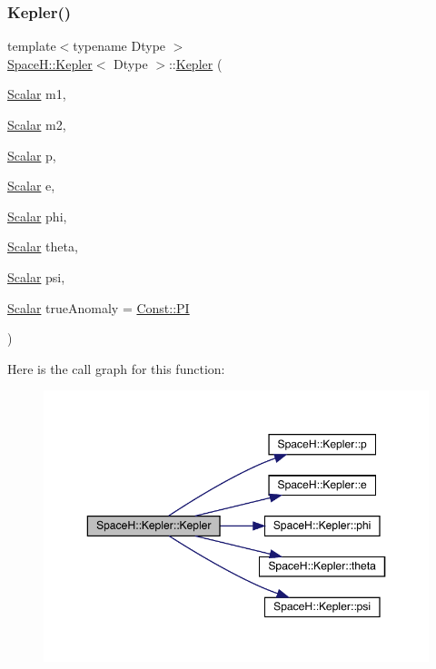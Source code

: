 \subsubsection{\texorpdfstring{Kepler()}{Kepler()}\hspace{0.1cm}{\footnotesize\ttfamily [3/3]}}
{\footnotesize\ttfamily template$<$typename Dtype $>$ \\
\mbox{\hyperlink{struct_space_h_1_1_kepler}{Space\+H\+::\+Kepler}}$<$ Dtype $>$\+::\mbox{\hyperlink{struct_space_h_1_1_kepler}{Kepler}} (\begin{DoxyParamCaption}\item[{\mbox{\hyperlink{struct_space_h_1_1_kepler_a19291f268209f594a96fb4828fa1a54c}{Scalar}}}]{m1,  }\item[{\mbox{\hyperlink{struct_space_h_1_1_kepler_a19291f268209f594a96fb4828fa1a54c}{Scalar}}}]{m2,  }\item[{\mbox{\hyperlink{struct_space_h_1_1_kepler_a19291f268209f594a96fb4828fa1a54c}{Scalar}}}]{p,  }\item[{\mbox{\hyperlink{struct_space_h_1_1_kepler_a19291f268209f594a96fb4828fa1a54c}{Scalar}}}]{e,  }\item[{\mbox{\hyperlink{struct_space_h_1_1_kepler_a19291f268209f594a96fb4828fa1a54c}{Scalar}}}]{phi,  }\item[{\mbox{\hyperlink{struct_space_h_1_1_kepler_a19291f268209f594a96fb4828fa1a54c}{Scalar}}}]{theta,  }\item[{\mbox{\hyperlink{struct_space_h_1_1_kepler_a19291f268209f594a96fb4828fa1a54c}{Scalar}}}]{psi,  }\item[{\mbox{\hyperlink{struct_space_h_1_1_kepler_a19291f268209f594a96fb4828fa1a54c}{Scalar}}}]{true\+Anomaly = {\ttfamily \mbox{\hyperlink{namespace_space_h_1_1_const_afdcc70c6f78ec4cf7baad3525ba7c618}{Const\+::\+PI}}} }\end{DoxyParamCaption})\hspace{0.3cm}{\ttfamily [inline]}}

Here is the call graph for this function\+:
\nopagebreak
\begin{figure}[H]
\begin{center}
\leavevmode
\includegraphics[width=350pt]{struct_space_h_1_1_kepler_ad451c2795f7525d1767d71333a673fc0_cgraph}
\end{center}
\end{figure}


